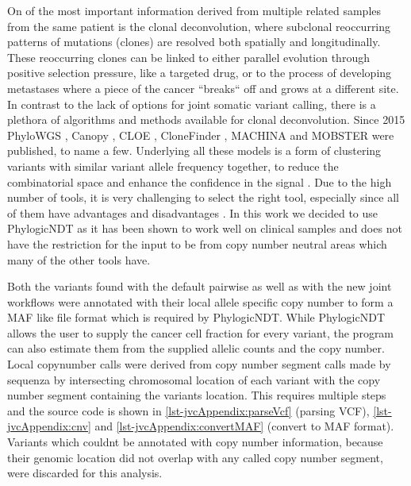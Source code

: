 On of the most important information derived from multiple related samples from the same patient is the clonal deconvolution, where subclonal reoccurring patterns of mutations (clones) are resolved both spatially and longitudinally. These reoccurring clones can be linked to either parallel evolution through positive selection pressure, like a targeted drug, or to the process of developing metastases where a piece of the cancer ``breaks`` off and grows at a different site.
In contrast to the lack of options for joint somatic variant calling, there is a plethora of algorithms and methods available for clonal deconvolution. Since 2015 PhyloWGS \cite{Deshwar2015}, Canopy \cite{Jiang2016}, CLOE \cite{Marass2016}, CloneFinder \cite{Miura2018}, MACHINA \cite{ElKebir2018} and MOBSTER \cite{Caravagna2020} were published, to name a few. Underlying all these models is a form of clustering variants with similar variant allele frequency together, to reduce the combinatorial space and enhance the confidence in the signal \cite{Tarabichi2021}. Due to the high number of tools, it is very challenging to select the right tool, especially since all of them have advantages and disadvantages \cite{Miura2020}. In this work we decided to use PhylogicNDT \cite{Leshchiner2018} as it has been shown to work well on clinical samples \cite{Gerstung2020} and does not have the restriction for the input to be from copy number neutral areas which many of the other tools have.


Both the variants found with the default pairwise as well as with the new joint workflows were annotated with their local allele specific copy number to form a MAF like file format which is required by PhylogicNDT. While PhylogicNDT allows the user to supply the cancer cell fraction for every variant, the program can also estimate them from the supplied allelic counts and the copy number. Local copynumber calls were derived from copy number segment calls made by sequenza by intersecting chromosomal location of each variant with the copy number segment containing the variants location. This requires multiple steps and the source code is shown in \autoref{lst-jvcAppendix:parseVcf} (parsing VCF), \autoref{lst-jvcAppendix:cnv} and \autoref{lst-jvcAppendix:convertMAF} (convert to MAF format). Variants which couldnt be annotated with copy number information, because their genomic location did not overlap with any called copy number segment, were discarded for this analysis.

